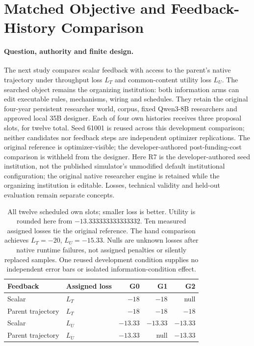 \section{Matched Objective and Feedback-History Comparison}
\label{sec:native-longitudinal-comparison}

\paragraph{Question, authority and finite design.}
The next study compares scalar feedback with access to the parent's native
trajectory under throughput loss $L_T$ and common-content utility loss $L_U$.
The searched object remains the organizing institution: both information arms
can edit executable rules, mechanisms, wiring and schedules. They retain the
original four-year persistent researcher world, corpus, fixed Qwen3-8B
researchers and approved local 35B designer. Each of four own histories receives
three proposal slots, for twelve total. Seed 61001 is reused across this
development comparison; neither candidates nor feedback steps are independent
optimizer replications. The original reference is optimizer-visible; the
developer-authored post-funding-cost comparison is withheld from the designer.
Here R7 is the developer-authored seed institution, not the published
simulator's unmodified default institutional configuration; the original native
researcher engine is retained while the organizing institution is editable.
Losses, technical validity and held-out evaluation remain separate concepts.

\begin{table}[t]
\centering
\small
\begin{tabular}{llrrr}
\toprule
Feedback & Assigned loss & G0 & G1 & G2 \\
\midrule
Scalar & $L_T$ & $-18$ & $-18$ & null \\
Parent trajectory & $L_T$ & $-18$ & $-18$ & $-18$ \\
Scalar & $L_U$ & $-13.33$ & $-13.33$ & $-13.33$ \\
Parent trajectory & $L_U$ & $-13.33$ & null & $-13.33$ \\
\bottomrule
\end{tabular}
\caption{All twelve scheduled own slots; smaller loss is better. Utility is
rounded here from $-13.333333333333332$. Ten measured assigned losses tie the
original reference. The hand comparison achieves $L_T=-20$, $L_U=-15.33$.
Nulls are unknown losses after native runtime failures, not assigned penalties
or silently replaced samples. One reused development condition supplies no
independent error bars or isolated information-condition effect.}
\label{tab:longitudinal-all-slots}
\end{table}

